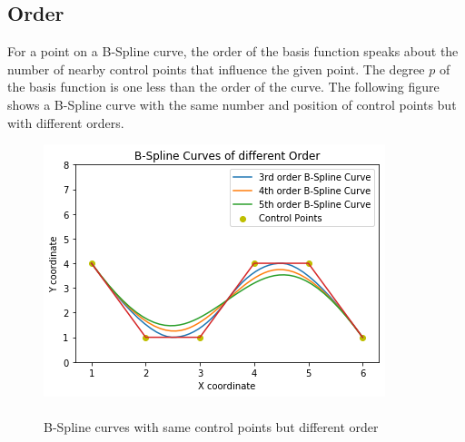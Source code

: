 \documentclass[11pt]{article}
\begin{document}
\subsection{Order }
For a point on a B-Spline curve, the order of the basis function speaks about the number of nearby control points that influence the given point. The degree $p$ of the basis function is one less than the order of the curve. The following figure shows a B-Spline curve with the same number and position of control points but with different orders.
\begin{figure}[H]
	\begin{center}
		\includegraphics[scale=0.7]{DegreeBspline.png} 
		\caption{\\B-Spline curves with same control points but different order}\label{DegreeBspline}
	\end{center}	
\end{figure}
\end{document}
